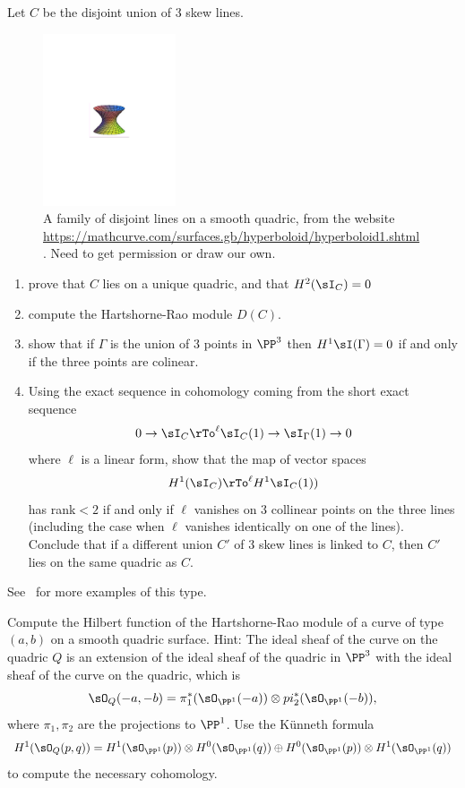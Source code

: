 \begin{exercise}
Let $C$ be the disjoint union of 3 skew lines. 

\begin{figure}
\begin{center}
\centerline {\includegraphics[height=2in]{"hyperboloid with disjoint lines.pdf"}}
\caption{A family of disjoint lines on a smooth quadric, from the website
\url{https://mathcurve.com/surfaces.gb/hyperboloid/hyperboloid1.shtml}. Need to get
permission or draw our own.}
\label{Fig15.2}
\end{center}
\end{figure}

\begin{enumerate}
 \item prove that $C$ lies on a unique quadric, and that $H^2(\sI_C) = 0$
 \item compute the Hartshorne-Rao module $D(C)$.
 \item show that if $\Gamma$ is the union of 3 points in $\PP^3$ then
 $H^1\sI(\Gamma) = 0$ if and only if the three points are colinear.
 \item Using the exact sequence in cohomology coming from the short exact sequence
$$
0\to \sI_C \rTo^{\ell} \sI_C(1) \to \sI_\Gamma(1) \to 0
$$
where $\ell$ is a linear form, show that the map of vector spaces
$$
H^1(\sI_C) \rTo^{\ell} H^1\sI_C(1))
$$
has rank$<2$ if and only if $\ell$ vanishes on 3 collinear points on the three lines (including the case when $\ell$ vanishes identically on one of the lines).
Conclude that if a different union $C'$ of 3 skew lines is linked to $C$, then $C'$ lies on the same quadric as $C$.
\end{enumerate}
See~\cite{Migliore} for more examples of this type.
\end{exercise}

\begin{exercise}
 Compute the Hilbert function of the Hartshorne-Rao module of a curve of type $(a,b)$ on a smooth quadric surface.
 Hint: The ideal sheaf of the curve on the quadric $Q$ is an extension of the ideal sheaf of the quadric in $\PP^3$
 with the ideal sheaf of the curve on the quadric, which is 
 $$
 \sO_Q(-a,-b) = \pi_1^*(\sO_{\PP^1}(-a)) \otimes pi_2^*(\sO_{\PP^1}(-b)),
 $$
 where $\pi_1, \pi_2$ are the projections to $\PP^1$. Use the K\"unneth formula
 $$
 H^1(\sO_Q(p,q)) = H^1(\sO_{\PP^1}(p)) \otimes H^0(\sO_{\PP^1}(q)) \oplus
  H^0(\sO_{\PP^1}(p)) \otimes H^1(\sO_{\PP^1}(q))
 $$
  to compute the necessary cohomology.
\end{exercise}

